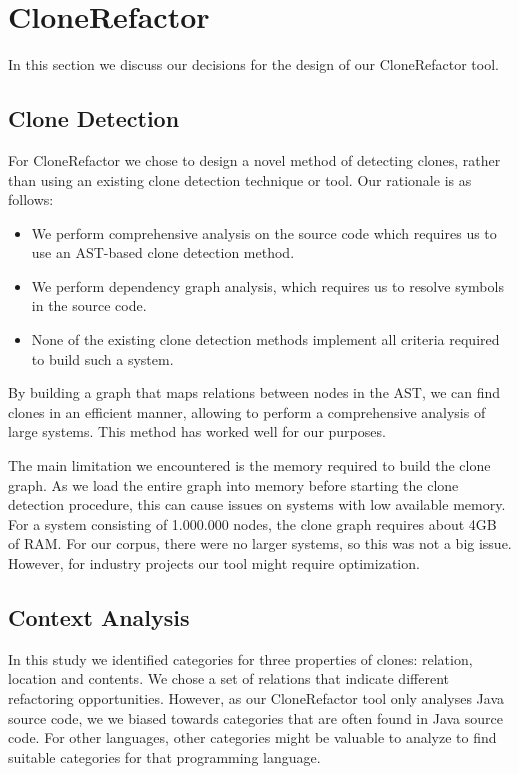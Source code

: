 \section{CloneRefactor}
In this section we discuss our decisions for the design of our CloneRefactor tool.

\subsection{Clone Detection}
For CloneRefactor we chose to design a novel method of detecting clones, rather than using an existing clone detection technique or tool. Our rationale is as follows:
\begin{itemize}
  \item We perform comprehensive analysis on the source code which requires us to use an AST-based clone detection method.
  \item We perform dependency graph analysis, which requires us to resolve symbols in the source code.
  \item None of the existing clone detection methods implement all criteria required to build such a system.
\end{itemize}
By building a graph that maps relations between nodes in the AST, we can find clones in an efficient manner, allowing to perform a comprehensive analysis of large systems. This method has worked well for our purposes.

The main limitation we encountered is the memory required to build the clone graph. As we load the entire graph into memory before starting the clone detection procedure, this can cause issues on systems with low available memory. For a system consisting of 1.000.000 nodes, the clone graph requires about 4GB of RAM. For our corpus, there were no larger systems, so this was not a big issue. However, for industry projects our tool might require optimization.

\subsection{Context Analysis}
In this study we identified categories for three properties of clones: relation, location and contents. %
We chose a set of relations that indicate different refactoring opportunities. However, as our CloneRefactor tool only analyses Java source code, we we biased towards categories that are often found in Java source code. For other languages, other categories might be valuable to analyze to find suitable categories for that programming language.

